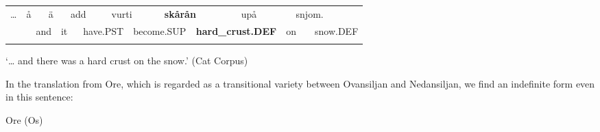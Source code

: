 \begin{tabular}{llllllllllllllll}
\lsptoprule
… & \multicolumn{2}{l}{å

} & \multicolumn{2}{l}{ä

} & \multicolumn{2}{l}{add

} & \multicolumn{2}{l}{vurti

} & \multicolumn{2}{l}{{\bfseries skårån}

} & \multicolumn{2}{l}{upå

} & \multicolumn{2}{l}{snjom.

} & \\
\multicolumn{2}{l}{} & \multicolumn{2}{l}{and

} & \multicolumn{2}{l}{it

} & \multicolumn{2}{l}{have.PST

} & \multicolumn{2}{l}{become.SUP

} & \multicolumn{2}{l}{{\bfseries hard\_crust.DEF}

} & \multicolumn{2}{l}{on

} & \multicolumn{2}{l}{snow.DEF

}\\
\lspbottomrule
\end{tabular}

\begin{styleTranslation}
‘… and there was a hard crust on the snow.’ (Cat Corpus)

\end{styleTranslation}

\begin{styleBodyTextFirst}
In the translation from Ore, which is regarded as a transitional variety between Ovansiljan and Nedansiljan, we find an indefinite form even in this sentence:

\end{styleBodyTextFirst}

\begin{listWWNumileveli}
\item 

\begin{styleExample}
Ore (Os)

\end{styleExample}

\end{listWWNumileveli}

